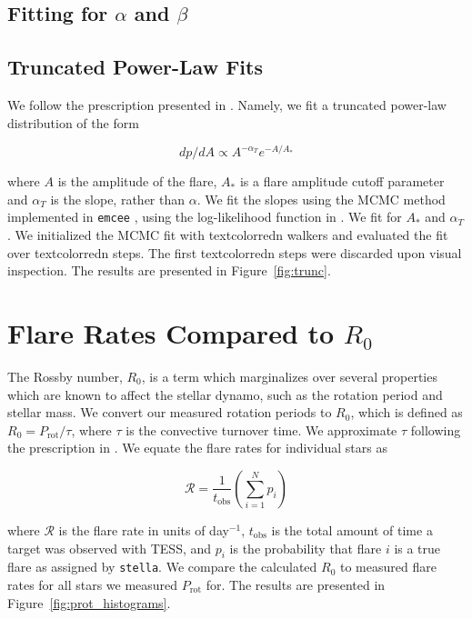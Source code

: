 \documentclass[twocolumn]{aastex631}
\begin{document}
\subsection{Fitting for $\alpha$ and $\beta$}


\subsection{Truncated Power-Law Fits}

We follow the prescription presented in \cite{seligman22}. Namely, we fit a truncated
power-law distribution of the form

\begin{equation}
  dp/dA \propto A^{-\alpha_T} e^{-A/A_*}
\end{equation}

where $A$ is the amplitude of the flare, $A_*$ is a flare amplitude cutoff parameter
and $\alpha_T$ is the slope, rather than
$\alpha$. We fit the slopes using the MCMC method implemented in \texttt{emcee}
\citep{goodman10, emcee}, using the log-likelihood function in \cite{seligman22}.
We fit for $A_*$ and $\alpha_T$. We initialized the MCMC fit with textcolor{red}{n}
walkers and evaluated the fit over textcolor{red}{n} steps. The first textcolor{red}{n}
steps were discarded upon visual inspection. The results are presented in Figure~\ref{fig:trunc}.

\section{Flare Rates Compared to $R_0$}

The Rossby number, $R_0$, is a term which marginalizes over several properties which are known to
affect the stellar dynamo, such as the rotation period and stellar mass. We convert our measured
rotation periods to $R_0$, which is defined as $R_0 = P_\textrm{rot}/\tau$, where $\tau$ is the
convective turnover time. We approximate $\tau$ following the prescription in \cite{wright11}. We
equate the flare rates for individual stars as

\begin{equation}\label{eqn:fr}
  \mathcal{R} = \frac{1}{t_\textrm{obs}} \left( \sum_{i=1}^{N} p_i \right)
\end{equation}

where $\mathcal{R}$ is the flare rate in units of day$^{-1}$, $t_\textrm{obs}$ is the total amount of time a target was
observed with TESS, and $p_i$ is the probability that flare $i$ is a true flare as assigned by \texttt{stella}.
We compare the calculated $R_0$ to measured flare rates for all stars we measured $P_\textrm{rot}$ for. The
results are presented in Figure~\ref{fig:prot_histograms}.
\end{document}
